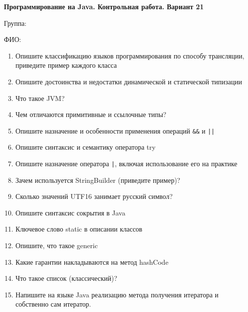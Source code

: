 \documentclass[12pt]{article}
\begin{document}
\newpage\begin{minipage}{\textwidth}
\textbf{Программирование на Java. Контрольная работа. Вариант 21}

Группа: \underline{\hspace{3cm}}

ФИО: \underline{\hspace{10cm}}

\begin{enumerate}
\item Опишите классификацию языков программирования по способу трансляции, приведите пример каждого класса
\item Опишите достоинства и недостатки динамической и статической типизации
\item Что такое JVM?
\item Чем отличаются примитивные и ссылочные типы?
\item Опишите назначение и особенности применения операций \verb|&&| и \verb!||!
\item Опишите синтаксис и семантику оператора try
\item Опишите назначение оператора \verb!|!, включая использование его на практике
\item Зачем используется StringBuilder (приведите пример)?
\item Сколько значений UTF16 занимает русский символ?
\item Опишите синтаксис сокрытия в Java
\item Ключевое слово static в описании классов
\item Опишите, что такое generic
\item Какие гарантии накладываются на метод hashCode
\item Что такое список (классический)?
\item Напишите на языке Java реализацию метода получения итератора и собственно сам итератор.

\end{enumerate}
\end{minipage}
\end{document}
